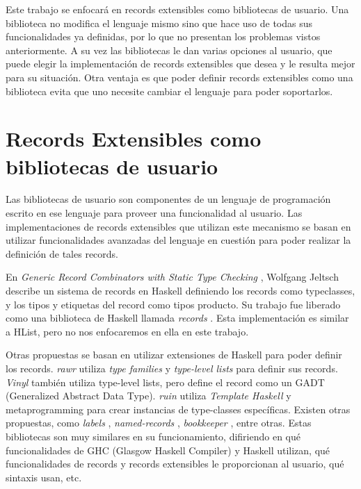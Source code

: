 Este trabajo se enfocará en records extensibles como bibliotecas de usuario. Una biblioteca no modifica el lenguaje mismo sino que hace uso de todas sus funcionalidades ya definidas, por lo que no presentan los problemas vistos anteriormente. A su vez las bibliotecas le dan varias opciones al usuario, que puede elegir la implementación de records extensibles que desea y le resulta mejor para su situación. Otra ventaja es que poder definir records extensibles como una biblioteca evita que uno necesite cambiar el lenguaje para poder soportarlos.

\section{Records Extensibles como bibliotecas de usuario}

Las bibliotecas de usuario son componentes de un lenguaje de programación escrito en ese lenguaje para proveer una funcionalidad al usuario. Las implementaciones de records extensibles que utilizan este mecanismo se basan en utilizar funcionalidades avanzadas del lenguaje en cuestión para poder realizar la definición de tales records.

En \textit{Generic Record Combinators with Static Type Checking} \cite{Jeltsch:2010:GRC:1836089.1836108}, Wolfgang Jeltsch describe un sistema de records en Haskell definiendo los records como typeclasses, y los tipos y etiquetas del record como tipos producto. Su trabajo fue liberado como una biblioteca de Haskell llamada \textit{records} \cite{HaskellRecords}. Esta implementación es similar a HList, pero no nos enfocaremos en ella en este trabajo.

Otras propuestas se basan en utilizar extensiones de Haskell para poder definir los records. \textit{rawr} \cite{HaskellRawr} utiliza \textit{type families} y \textit{type-level lists} para definir sus records. \textit{Vinyl} \cite{HaskellVinyl} también utiliza type-level lists, pero define el record como un GADT (Generalized Abstract Data Type). \textit{ruin} \cite{HaskellRuin} utiliza \textit{Template Haskell} y metaprogramming para crear instancias de type-classes específicas. Existen otras propuestas, como \textit{labels} \cite{HaskellLabels}, \textit{named-records} \cite{HaskellNamedRecords}, \textit{bookkeeper} \cite{HaskellBookkeeper}, entre otras. Estas bibliotecas son muy similares en su funcionamiento, difiriendo en qué funcionalidades de GHC (Glasgow Haskell Compiler) y Haskell utilizan, qué funcionalidades de records y records extensibles le proporcionan al usuario, qué sintaxis usan, etc.

